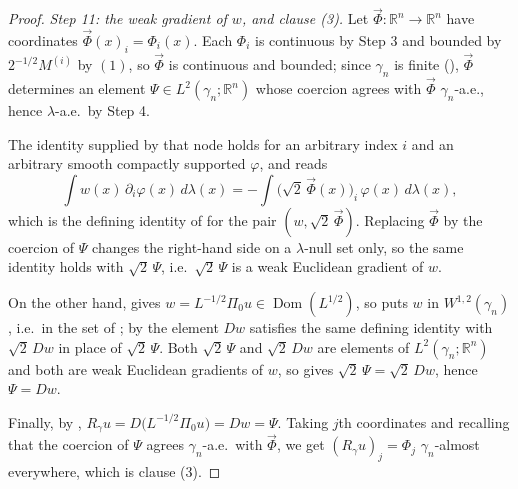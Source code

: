 \begin{proof}
\emph{Step 11: the weak gradient of $w$, and clause (3).}
Let $\vec\Phi : \mathbb{R}^n \to \mathbb{R}^n$ have coordinates
$\vec\Phi(x)_i = \Phi_i(x)$.  Each $\Phi_i$ is continuous by Step 3 and bounded
by $2^{-1/2}M^{(i)}$ by $(1)$, so $\vec\Phi$ is continuous and bounded; since
$\gamma_n$ is finite (), $\vec\Phi$ determines an element
$\Psi \in L^2(\gamma_n;\mathbb{R}^n)$ whose coercion agrees with $\vec\Phi$
$\gamma_n$-a.e., hence $\lambda$-a.e.\ by Step 4.

The identity supplied by that node holds for an arbitrary index $i$ and an
arbitrary smooth compactly supported $\varphi$, and reads
\[
  \int w(x)\,\partial_i\varphi(x)\,d\lambda(x)
    = -\int \bigl(\sqrt2\,\vec\Phi(x)\bigr)_i\,\varphi(x)\,d\lambda(x) ,
\]
which is the defining identity of  for the pair
$(w, \sqrt2\,\vec\Phi)$.  Replacing $\vec\Phi$ by the coercion of $\Psi$ changes
the right-hand side on a $\lambda$-null set only, so the same identity holds
with $\sqrt2\,\Psi$, i.e.\ $\sqrt2\,\Psi$ is a weak Euclidean gradient of $w$.

On the other hand,  gives
$w = L^{-1/2}\Pi_0 u \in \operatorname{Dom}(L^{1/2})$, so
 puts $w$ in $W^{1,2}(\gamma_n)$, i.e.\ in the set of
; by  the element $Dw$ satisfies the same
defining identity with $\sqrt2\,Dw$ in place of $\sqrt2\,\Psi$.  Both
$\sqrt2\,\Psi$ and $\sqrt2\,Dw$ are elements of $L^2(\gamma_n;\mathbb{R}^n)$ and
both are weak Euclidean gradients of $w$, so  gives
$\sqrt2\,\Psi = \sqrt2\,Dw$, hence $\Psi = Dw$.

Finally, by , $R_\gamma u = D\bigl(L^{-1/2}\Pi_0 u\bigr)
= Dw = \Psi$.  Taking $j$th coordinates and recalling that the coercion of
$\Psi$ agrees $\gamma_n$-a.e.\ with $\vec\Phi$, we get
$(R_\gamma u)_j = \Phi_j$ $\gamma_n$-almost everywhere, which is clause (3).
\end{proof}
